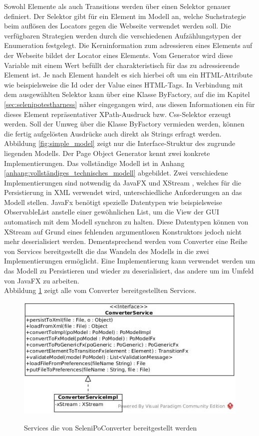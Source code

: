Sowohl Elemente als auch Transitions werden über einen Selektor genauer definiert.
Der Selektor gibt für ein Element im Modell an, welche Suchstrategie beim auflösen des Locators gegen die Webseite verwendet werden soll.
Die verfügbaren Strategien werden durch die verschiedenen Aufzählungstypen der Enumeration festgelegt.
Die Kerninformation zum adressieren eines Elements auf der Webseite bildet der Locator eines Elements. Vom Generator wird diese Variable mit einem Wert befüllt der charakteristisch für das zu adressierende Element ist. Je nach Element handelt es sich hierbei oft um ein HTML-Attribute wie beispielsweise die Id oder der Value eines HTML-Tags. In Verbindung mit dem ausgewählten Selektor kann über eine Klasse ByFactory, auf die im Kapitel \ref{sec:selenipotestharness} näher eingegangen wird, aus diesen Informationen ein für dieses Element repräsentativer XPath-Ausdruck bzw. Css-Selektor erzeugt werden. Soll der Umweg über die Klasse ByFactory vermieden werden, können die fertig aufgelösten Ausdrücke auch direkt als Strings erfragt werden.\\
Abbildung \ref{fig:simple_model} zeigt nur die Interface-Struktur des zugrunde liegenden Modells. Der Page Object Generator kennt zwei konkrete Implementierungen. Das vollständige Modell ist in Anhang \ref{anhang:vollständiges_technisches_modell} abgebildet.
Zwei verschiedene Implementierungen sind notwendig da JavaFX und XStream \cite{joe_walnes_xstream_2015}, welches für die Persistierung in XML verwendet wird, unterschiedliche Anforderungen an das Modell stellen. JavaFx benötigt spezielle Datentypen wie beispielsweise ObservableList anstelle einer gewöhnlichen List, um die View der GUI automatisch mit dem Modell synchron zu halten. Diese Datentypen können von XStream auf Grund eines fehlenden argumentlosen Konstruktors jedoch nicht mehr deserialisiert werden.
Dementsprechend werden vom Converter eine Reihe von Services bereitgestellt die das Wandeln des Modells in die zwei Implementierungen ermöglicht. Eine Implementierung kann verwendet werden um das Modell zu Persistieren und wieder zu deserialisiert, das andere um im Umfeld von JavaFX zu arbeiten.\\
Abbildung \ref{fig:converter_service} zeigt alle vom Converter bereitgestellten Services. 

\begin{figure}[htb]
  \centering  
  \includegraphics[scale=0.5]{img/ConverterService.jpg}\\
  \caption{Services die von SeleniPoConverter bereitgestellt werden}
  \label{fig:converter_service}
\end{figure}

